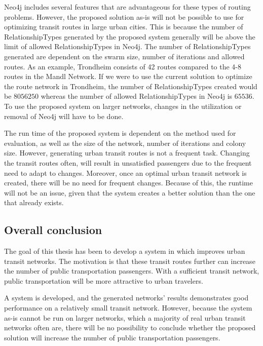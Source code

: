 Neo4j includes several features that are advantageous for these types of routing problems. However, the proposed solution as-is will not be possible to use for optimizing transit routes in large urban cities. This is because the number of RelationshipTypes generated by the proposed system generally will be above the limit of allowed RelationshipTypes in Neo4j. The number of RelationshipTypes generated are dependent on the swarm size, number of iterations and allowed routes. As an example, Trondheim consists of 42 routes compared to the 4-8 routes in the Mandl Network. If we were to use the current solution to optimize the route network in Trondheim, the number of RelationshipTypes created would be $8056250$ whereas the number of allowed RelationshipTypes in Neo4j is $65536$. To use the proposed system on larger networks, changes in the utilization or removal of Neo4j will have to be done. 

The run time of the proposed system is dependent on the method used for evaluation, as well as the size of the network, number of iterations and colony size. However, generating urban transit routes is not a frequent task. Changing the transit routes often, will result in unsatisfied passengers due to the frequent need to adapt to changes. Moreover, once an optimal urban transit network is created, there will be no need for frequent changes. Because of this, the runtime will not be an issue, given that the system creates a better solution than the one that already exists. 


\subsection*{Overall conclusion}
The goal of this thesis has been to develop a system in which improves urban transit networks. The motivation is that these transit routes further can increase the number of public transportation passengers. With a sufficient transit network, public transportation will be more attractive to urban travelers.

A system is developed, and the generated networks' results demonstrates good performance on a relatively small transit network.  However, because the system as-is cannot be run on larger networks, which a majority of real urban transit networks often are, there will be no possibility to conclude whether the proposed solution will increase the number of public transportation passengers. 
